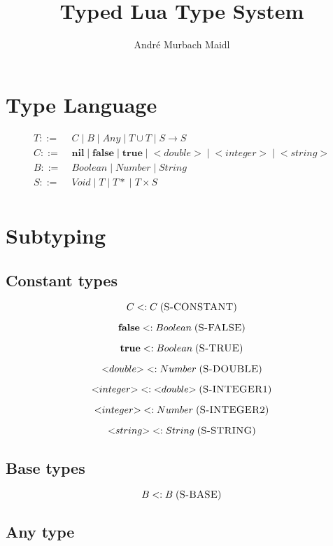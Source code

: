\documentclass[12pt]{article}
\title{Typed Lua Type System}
\author{André Murbach Maidl}
\newcommand{\mylabel}[1]{\; (\textsc{#1})}
\newcommand{\subtype}{<:}
\newcommand{\pipe}{|\;}
\begin{document}
\maketitle

\section{Type Language}

\begin{align*}
T ::= \; & C \; \pipe B \; \pipe Any \; \pipe
T \cup T \; \pipe S \rightarrow S\\
C ::= \; & \mathbf{nil} \; \pipe \mathbf{false} \; \pipe \mathbf{true} \;
\pipe {<}double{>} \; \pipe {<}integer{>} \; \pipe {<}string{>}\\
B ::= \; & Boolean \; \pipe Number \; \pipe String\\
S ::= \; & Void \; \pipe T \; \pipe {T*} \; \pipe T \times S\\ 
\end{align*}

\section{Subtyping}

\subsection{Constant types}

\[
C \subtype C
\mylabel{S-CONSTANT}
\]

\[
\mathbf{false} \subtype Boolean
\mylabel{S-FALSE}
\]

\[
\mathbf{true} \subtype Boolean
\mylabel{S-TRUE}
\]

\[
{<}double{>} \subtype Number
\mylabel{S-DOUBLE}
\]

\[
{<}integer{>} \subtype {<}double{>}
\mylabel{S-INTEGER1}
\]

\[
{<}integer{>} \subtype Number
\mylabel{S-INTEGER2}
\]

\[
{<}string{>} \subtype String
\mylabel{S-STRING}
\]

\subsection{Base types}

\[
B \subtype B
\mylabel{S-BASE}
\]

\subsection{Any type}
\end{document}
